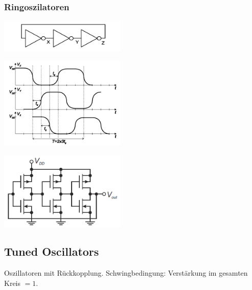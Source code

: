 \subsubsection{Ringoszilatoren}
	\begin{multicols}{3}
	 	\includegraphics[width=6cm]{images/osziRing.png}	
		\columnbreak
		
		\includegraphics[width=6cm]{images/osziRingSignal.png}	
		\columnbreak
		
		\includegraphics[width=6cm]{images/osziRingCMOS.png}
	\end{multicols}
	
\subsection{Tuned Oscillators}
	Oszillatoren mit Rückkopplung. Schwingbedingung: Verstärkung im gesamten Kreis $=1$. 
